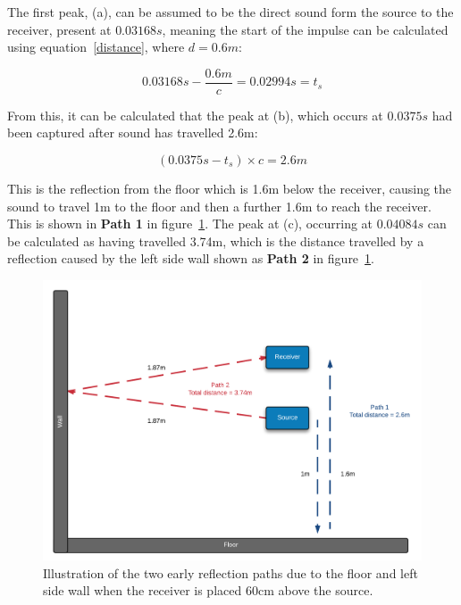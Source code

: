 \documentclass[../../main.tex]{subfiles}
\begin{document}
			The first peak, (a), can be assumed to be the direct sound form the source to the receiver, present at $0.03168s$, meaning the start of the impulse can be calculated using equation~\ref{distance}, where $d = 0.6m$:

			\begin{equation}
			0.03168s - \frac{0.6m}{c} = 0.02994s = t_s
			\end{equation}

			From this, it can be calculated that the peak at (b), which occurs at $0.0375s$ had been captured after sound has travelled 2.6m:

			\begin{equation}
			(0.0375s - t_s)\times{c} = 2.6m
			\end{equation}

			This is the reflection from the floor which is 1.6m below the receiver, causing the sound to travel 1m to the floor and then a further 1.6m to reach the receiver. This is shown in \textbf{Path 1} in figure~\ref{reflectionPaths}. The peak at (c), occurring at $0.04084s$ can be calculated as having travelled 3.74m, which is the distance travelled by a reflection caused by the left side wall shown as \textbf{Path 2} in figure~\ref{reflectionPaths}.

			\begin{figure}[t]
			\centerline{\includegraphics[width=\textwidth]{Sections/Implementation/Odeon/images/incorrectRIR/reflectionPaths_colourV2.png}}
				\caption{Illustration of the two early reflection paths due to the floor and left side wall when the receiver is placed 60cm above the source.}
				\label{reflectionPaths}
			\end{figure}
\end{document}

